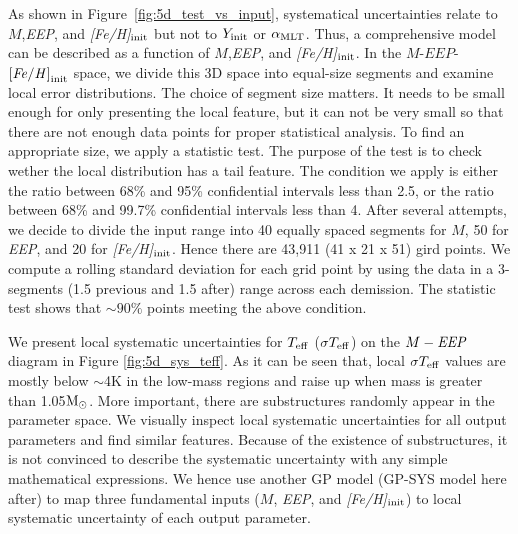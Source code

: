 As shown in Figure~\ref{fig:5d_test_vs_input}, systematical uncertainties relate to $M$,{\it EEP}, and {\it [Fe/H]}$_{\rm init}$ but not to $Y_{\rm init}$ or $\alpha_{\rm MLT}$.  Thus, a comprehensive model can be described as a function of $M$,{\it EEP}, and {\it [Fe/H]}$_{\rm init}$. In the $M$-$EEP$-$\rm {\it [Fe/H]}_{init}$ space, we divide this 3D space into equal-size segments and examine local error distributions. 
The choice of segment size matters. It needs to be small enough for only presenting the local feature, but it can not be very small so that there are not enough data points for proper statistical analysis. 
%
To find an appropriate size, we apply a statistic test. The purpose of the test is to check wether the local distribution has a tail feature. The condition we apply is either the ratio between 68\% and 95\% confidential intervals less than 2.5, or the ratio between 68\% and 99.7\% confidential intervals less than 4. 
%
After several attempts, we decide to divide the input range into 40 equally spaced segments for $M$, 50 for {\it EEP}, and 20 for {\it [Fe/H]}$_{\rm init}$. Hence there are 43,911 (41 x 21 x 51) gird points. We compute a rolling standard deviation for each grid point by using the data in a 3-segments (1.5 previous and 1.5 after) range across each demission. The statistic test shows that $\sim90\%$ points meeting the above condition. 

We present local systematic uncertainties for $T_{\rm eff}$ ($\sigma T_{\rm eff}$) on the $M-{\it EEP}$ diagram in Figure \ref{fig:5d_sys_teff}. As it can be seen that, local $\sigma T_{\rm eff}$ values are mostly below $\sim$4K in the low-mass regions and raise up when mass is greater than 1.05$\rm M_{\odot}$. More important, there are substructures randomly appear in the parameter space. 
We visually inspect local systematic uncertainties for all output parameters and find similar features. 
Because of the existence of substructures, it is not convinced to describe the systematic uncertainty with any simple mathematical expressions. We hence use another GP model (GP-SYS model here after) to map three fundamental inputs ($M$, {\it EEP}, and {\it [Fe/H]}$_{\rm init}$) to local systematic uncertainty of each output parameter.   

